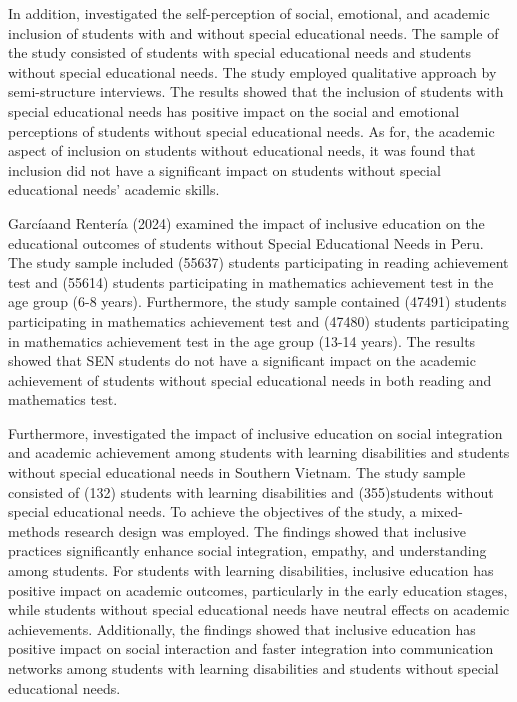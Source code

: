 \documentclass[10pt]{NSP1}
\begin{document}
In addition, \cite{18} investigated the self-perception of social, emotional, and academic inclusion of students with and without special educational needs. The sample of the study consisted of \cite{6} students with special educational needs and \cite{3} students without special educational needs. The study employed qualitative approach by semi-structure interviews. The results showed that the inclusion of students with special educational needs has positive impact on the social and emotional perceptions of students without special educational needs. As for, the academic aspect of inclusion on students without educational needs, it was found that inclusion did not have a significant impact on students without special educational needs' academic skills.

Garcíaand Rentería (2024) examined the impact of inclusive education on the educational outcomes of students without Special Educational Needs in Peru. The study sample included (55637) students participating in reading achievement test and (55614) students participating in mathematics achievement test in the age group (6-8 years). Furthermore, the study sample contained (47491) students participating in mathematics achievement test and (47480) students participating in mathematics achievement test in the age group (13-14 years). The results showed that SEN students do not have a significant impact on the academic achievement of students without special educational needs in both reading and mathematics test.

Furthermore, \cite{15} investigated the impact of inclusive education on social integration and academic achievement among students with learning disabilities and students without special educational needs in Southern Vietnam. The study sample consisted of (132) students with learning disabilities and (355)students without special educational needs. To achieve the objectives of the study, a mixed-methods research design was employed. The findings showed that inclusive practices significantly enhance social integration, empathy, and understanding among students. For students with learning disabilities, inclusive education has positive impact on academic outcomes, particularly in the early education stages, while students without special educational needs have neutral effects on academic achievements. Additionally, the findings showed that inclusive education has positive impact on social interaction and faster integration into communication networks among students with learning disabilities and students without special educational needs.
\end{document}
